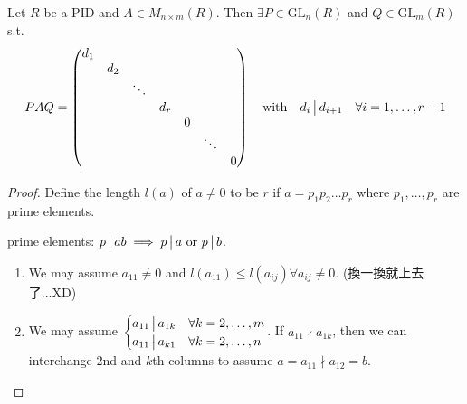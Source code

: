 \begin{theorem}
  Let $R$ be a PID and $A \in M_{n\times m}(R)$. Then
  $\exists P \in \text{GL}_n(R)$ and $Q \in \text{GL}_m(R)$ s.t.
  \[
    PAQ = \begin{pmatrix}
    d_1 \\
    & d_2 \\
    & & \ddots \\
    & & & d_r \\
    & & & & 0 \\
    & & & & & \ddots \\
    & & & & & & 0
    \end{pmatrix}
    \quad \text{with} \quad
    d_i \,\big|\, d_{i+1} \quad \forall i = 1, \dots, r-1
  \]
  \begin{proof}
    Define the length $l(a)$ of $a \ne 0$ to be $r$ if $a = p_1p_2 \dots p_r$
    where $p_1, \dots, p_r$ are prime elements.

    prime elements: $p \,\big|\, ab \implies p \,\big|\, a \text{~or~} p \,\big|\, b$.

    \begin{enumerate}
      \item We may assume $a_{11} \ne 0$ and $l(a_{11}) \le l(a_{ij})
        \forall a_{ij} \ne 0$. (換一換就上去了...XD)
      \item We may assume $\begin{cases}
          a_{11} \,\big|\, a_{1k} & \forall k = 2, \dots, m \\
          a_{11} \,\big|\, a_{k1} & \forall k = 2, \dots, n
        \end{cases}$.
        If $a_{11} \nmid a_{1k}$, then we can interchange 2nd and $k$th
        columns to assume $a = a_{11} \nmid a_{12} = b$.


\end{enumerate}
\end{proof}
\end{theorem}
